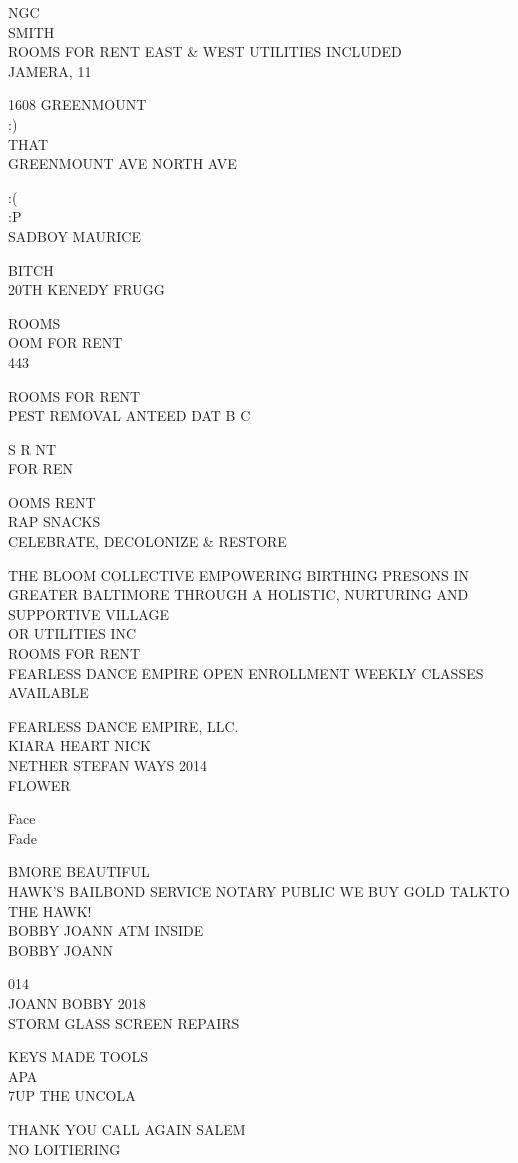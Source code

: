 \documentclass[10pt,letterpaper]{article}
\begin{document}
NGC\\
SMITH\\
ROOMS FOR RENT EAST \& WEST UTILITIES INCLUDED\\
JAMERA, 11

1608 GREENMOUNT\\
:)\\
THAT\\
GREENMOUNT AVE NORTH AVE

:(\\
:P\\
SADBOY MAURICE

BITCH\\
20TH KENEDY FRUGG

ROOMS\\
OOM FOR RENT\\
443

ROOMS FOR RENT\\
PEST REMOVAL ANTEED DAT B C

S R NT\\
FOR REN

OOMS RENT\\
RAP SNACKS\\
CELEBRATE, DECOLONIZE \& RESTORE

THE BLOOM COLLECTIVE EMPOWERING BIRTHING PRESONS IN GREATER BALTIMORE THROUGH A HOLISTIC, NURTURING AND SUPPORTIVE VILLAGE\\
OR UTILITIES INC\\
ROOMS FOR RENT\\
FEARLESS DANCE EMPIRE OPEN ENROLLMENT WEEKLY CLASSES AVAILABLE

FEARLESS DANCE EMPIRE, LLC.\\
KIARA HEART NICK\\
NETHER STEFAN WAYS 2014\\
FLOWER

Face\\
Fade

BMORE BEAUTIFUL\\
HAWK'S BAILBOND SERVICE NOTARY PUBLIC WE BUY GOLD TALKTO THE HAWK!\\
BOBBY JOANN ATM INSIDE\\
BOBBY JOANN

014\\
JOANN BOBBY 2018\\
STORM GLASS SCREEN REPAIRS

KEYS MADE TOOLS\\
APA\\
7UP THE UNCOLA

THANK YOU CALL AGAIN SALEM\\
NO LOITIERING
\end{document}
